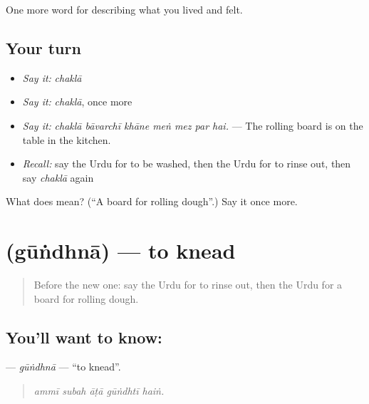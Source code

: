 \begin{grammarlens}[title={What you've built}]
One more word for describing what you lived and felt.
\end{grammarlens}

\subsection*{Your turn}
\begin{itemize}
\raggedright
  \item \emph{Say it:} \emph{chaklā}
  \item \emph{Say it:} \emph{chaklā}, once more
  \item \emph{Say it:} \emph{chaklā bāvarchī khāne meṅ mez par hai.} — The rolling board is on the table in the kitchen.
  \item \emph{Recall:} say the Urdu for to be washed, then the Urdu for to rinse out, then say \emph{chaklā} again
\end{itemize}

\begin{tcolorbox}[breakable,colback=teal!4,colframe=teal!35!black,title={Before you move on}]
What does  mean? (\textquotedblleft{}A board for rolling dough\textquotedblright{}.) Say it once more.
\end{tcolorbox}
\section[\texorpdfstring{\ur{گوندھنا} (gūṅdhnā)}{گوندھنا (gūṅdhnā)}]{ (gūṅdhnā) — to knead}

\label{lesson:UR-C507-gundhna}



\begin{quote}
Before the new one: say the Urdu for to rinse out, then the Urdu for a board for rolling dough.
\end{quote}

\subsection*{You'll want to know: }
\textbf{} — \emph{gūṅdhnā} — \textquotedblleft{}to knead\textquotedblright{}.

\begin{quote}
    
\end{quote}

\begin{quote}
\emph{ammī subah āṭā gūṅdhtī haiṅ.}
\end{quote}


